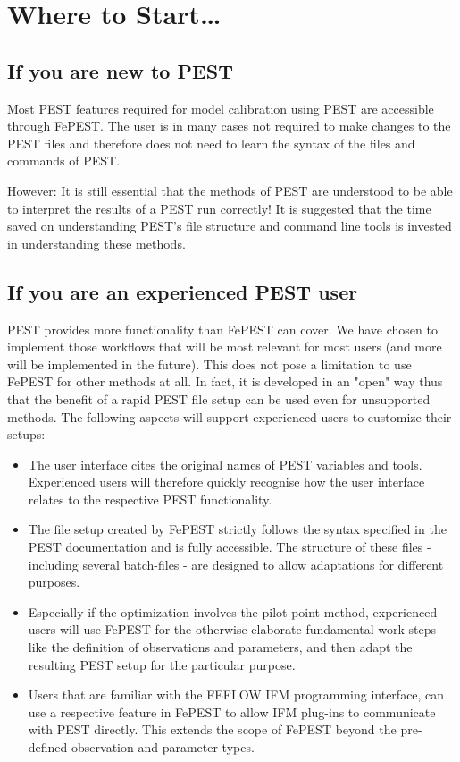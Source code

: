 \section{Where to Start…}

\subsection{If you are new to PEST}

Most PEST features required for model calibration using PEST are accessible through FePEST. The user is in many cases not required to make changes to the PEST files and therefore does not need to learn the syntax of the files and commands of PEST.

However: It is still essential that the methods of PEST are understood to be able to interpret the  results of a PEST run correctly! It is suggested that the time saved on understanding PEST's file structure and command line tools is invested in understanding these methods.

\subsection{If you are an experienced PEST user}

PEST provides more functionality than FePEST can cover. We have chosen to implement those workflows that will be most relevant for most users (and more will be implemented in the future). 
This does not pose a limitation to use FePEST for other methods at all. In fact, it is developed in an "open" way thus that the benefit of a rapid PEST file setup can be used even for unsupported methods. The following aspects will support experienced users to customize their setups:

\begin{itemize}

\item The user interface cites the original names of PEST variables and tools. Experienced users will therefore quickly recognise how the user interface relates to the respective PEST functionality.

\item The file setup created by FePEST strictly follows the syntax specified in the PEST documentation and is fully accessible. The structure of these files - including several batch-files - are designed to allow adaptations for different purposes.

\item Especially if the optimization involves the pilot point method, experienced users will use FePEST for the otherwise elaborate fundamental work steps like the definition of observations and parameters, and then adapt the resulting PEST setup for the particular purpose.

\item Users that are familiar with the FEFLOW IFM programming interface, can use a respective feature in FePEST to allow IFM plug-ins to communicate with PEST directly. This extends the scope of FePEST beyond the pre-defined observation and parameter types.
\end{itemize}



